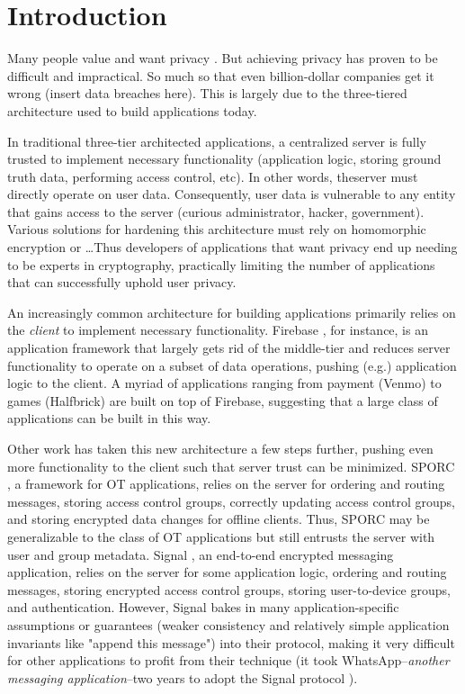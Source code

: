 \section{Introduction}

Many people value and want privacy \cite{}. But achieving privacy has proven to 
be difficult and impractical. So much so that even billion-dollar companies get 
it wrong (insert data breaches here). This is largely due to the three-tiered 
architecture used to build applications today. 

In traditional three-tier architected applications, a centralized server is
fully trusted to implement necessary functionality (application logic, storing
ground truth data, performing access control, etc). In other words, theserver
must directly operate on user data. Consequently, user data is vulnerable to any
entity that gains access to the server (curious administrator, hacker,
government). Various solutions for hardening this architecture must rely on
homomorphic encryption \cite{cryptdb} or \dots Thus developers of applications
that want privacy end up needing to be experts in cryptography, practically
limiting the number of applications that can successfully uphold user privacy.

An increasingly common architecture for building applications primarily relies 
on the \textit{client} to implement necessary functionality. Firebase 
\cite{firebase}, for instance, is an application framework that largely gets 
rid of the middle-tier and reduces server functionality to operate on a subset 
of data operations, pushing (e.g.) application logic to the client. A myriad of 
applications ranging from payment (Venmo) to games (Halfbrick) are built on top 
of Firebase, suggesting that a large class of applications can be built in this 
way. 

Other work has taken this new architecture a few steps further, pushing even 
more functionality to the client such that server trust can be minimized. 
SPORC \cite{sporc}, a framework for OT applications, relies on the server 
for ordering and routing messages, storing access control groups, correctly 
updating access control groups, and storing encrypted data changes for offline
clients. Thus, SPORC may be generalizable to the class of OT applications but 
still entrusts the server with user and group metadata. Signal \cite{signal}, 
an end-to-end encrypted messaging application, relies on the server for some 
application logic, ordering and routing messages, storing encrypted access 
control groups, storing user-to-device groups, and authentication. However, 
Signal bakes in many application-specific assumptions or guarantees
(weaker consistency and relatively simple application invariants like "append 
this message") into their protocol, making it very difficult for other 
applications to profit from their technique (it took WhatsApp\---\textit{another
messaging application}\---two years to adopt the Signal protocol 
\cite{whatsapp_adopts_signal}).


